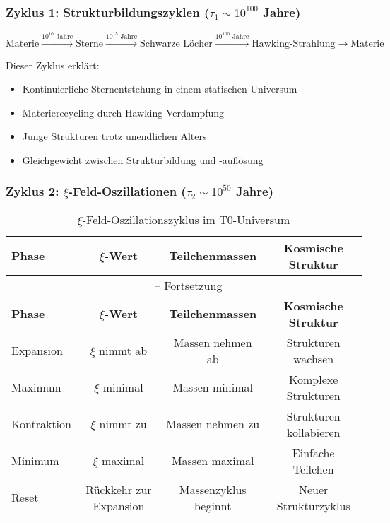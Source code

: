 \documentclass[12pt,a4paper]{article}
\theoremstyle{definition}
\begin{document}
	\subsubsection{Zyklus 1: Strukturbildungszyklen ($\tau_1 \sim 10^{100}$ Jahre)}
	
	\begin{equation}
		\text{Materie} \xrightarrow{10^{10} \text{ Jahre}} \text{Sterne} \xrightarrow{10^{15} \text{ Jahre}} \text{Schwarze Löcher} \xrightarrow{10^{100} \text{ Jahre}} \text{Hawking-Strahlung} \rightarrow \text{Materie}
	\end{equation}
	
	Dieser Zyklus erklärt:
	\begin{itemize}
		\item Kontinuierliche Sternentstehung in einem statischen Universum
		\item Materierecycling durch Hawking-Verdampfung
		\item Junge Strukturen trotz unendlichen Alters
		\item Gleichgewicht zwischen Strukturbildung und -auflösung
	\end{itemize}
	
	\subsubsection{Zyklus 2: $\xi$-Feld-Oszillationen ($\tau_2 \sim 10^{50}$ Jahre)}
	
	\begin{longtable}{lccc}
		\caption{$\xi$-Feld-Oszillationszyklus im T0-Universum} \\
		\toprule
		\textbf{Phase} & \textbf{$\xi$-Wert} & \textbf{Teilchenmassen} & \textbf{Kosmische Struktur} \\
		\midrule
		\endfirsthead
		\multicolumn{4}{c}{\tablename\ \thetable{} -- Fortsetzung} \\
		\toprule
		\textbf{Phase} & \textbf{$\xi$-Wert} & \textbf{Teilchenmassen} & \textbf{Kosmische Struktur} \\
		\midrule
		\endhead
		Expansion & $\xi$ nimmt ab & Massen nehmen ab & Strukturen wachsen \\
		Maximum & $\xi$ minimal & Massen minimal & Komplexe Strukturen \\
		Kontraktion & $\xi$ nimmt zu & Massen nehmen zu & Strukturen kollabieren \\
		Minimum & $\xi$ maximal & Massen maximal & Einfache Teilchen \\
		Reset & Rückkehr zur Expansion & Massenzyklus beginnt & Neuer Strukturzyklus \\
		\bottomrule
	\end{longtable}
	
\end{document}
